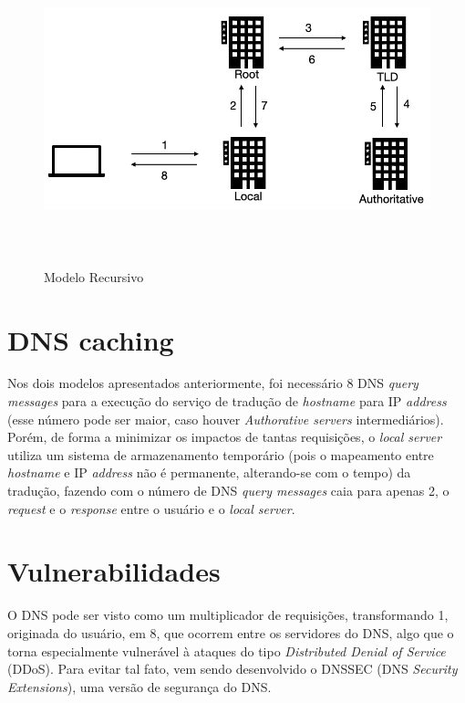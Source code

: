 \begin{figure}[H]
\centering
\includegraphics[keepaspectratio, width=12cm, height=9cm]{imagens/10/10 - modelo recursivo.png}
\caption{Modelo Recursivo \\}
\label{Modelo Recursivo}
\end{figure}



\hypertarget{dns-caching}{%
\section{DNS caching}\label{dns-caching}}

Nos dois modelos apresentados anteriormente, foi necessário 8 DNS
\emph{query messages} para a execução do serviço de tradução de
\emph{hostname} para IP \emph{address} (esse número pode ser maior, caso
houver \emph{Authorative servers} intermediários). Porém, de forma a
minimizar os impactos de tantas requisições, o \emph{local server}
utiliza um sistema de armazenamento temporário (pois o mapeamento entre
\emph{hostname} e IP \emph{address} não é permanente, alterando-se com o
tempo) da tradução, fazendo com o número de DNS \emph{query messages}
caia para apenas 2, o \emph{request} e o \emph{response} entre o usuário
e o \emph{local server}.

\hypertarget{vulnerabilidades}{%
\section{Vulnerabilidades}\label{vulnerabilidades}}

O DNS pode ser visto como um multiplicador de requisições, transformando
1, originada do usuário, em 8, que ocorrem entre os servidores do DNS,
algo que o torna especialmente vulnerável à ataques do tipo
\emph{Distributed Denial of Service} (DDoS). Para evitar tal fato, vem
sendo desenvolvido o DNSSEC (DNS \emph{Security Extensions}), uma versão
de segurança do DNS.

